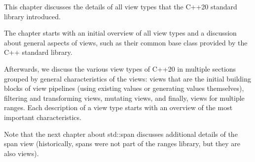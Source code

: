 This chapter discusses the details of all view types that the C++20 standard library introduced.

The chapter starts with an initial overview of all view types and a discussion about general aspects of views, such as their common base class provided by the C++ standard library.

Afterwards, we discuss the various view types of C++20 in multiple sections grouped by general characteristics of the views: views that are the initial building blocks of view pipelines (using existing values or generating values themselves), filtering and transforming views, mutating views, and finally, views for multiple ranges. Each description of a view type starts with an overview of the most important characteristics.

Note that the next chapter about std::span discusses additional details of the span view (historically, spans were not part of the ranges library, but they are also views).